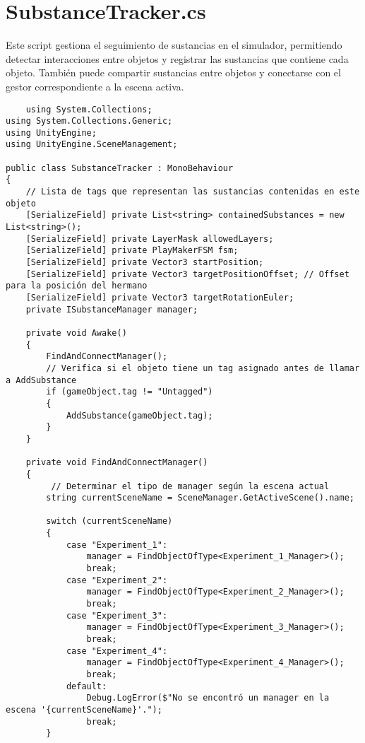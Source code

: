 \section{SubstanceTracker.cs}\label{script:SubstanceTracker}
Este script gestiona el seguimiento de sustancias en el simulador, permitiendo detectar interacciones entre objetos y registrar las sustancias que contiene cada objeto. También puede compartir sustancias entre objetos y conectarse con el gestor correspondiente a la escena activa.
\begin{verbatim}
    using System.Collections;
using System.Collections.Generic;
using UnityEngine;
using UnityEngine.SceneManagement;

public class SubstanceTracker : MonoBehaviour
{
    // Lista de tags que representan las sustancias contenidas en este objeto
    [SerializeField] private List<string> containedSubstances = new List<string>();
    [SerializeField] private LayerMask allowedLayers;
    [SerializeField] private PlayMakerFSM fsm;
    [SerializeField] private Vector3 startPosition;
    [SerializeField] private Vector3 targetPositionOffset; // Offset para la posición del hermano
    [SerializeField] private Vector3 targetRotationEuler;
    private ISubstanceManager manager;

    private void Awake()
    {
        FindAndConnectManager();
        // Verifica si el objeto tiene un tag asignado antes de llamar a AddSubstance
        if (gameObject.tag != "Untagged")
        {
            AddSubstance(gameObject.tag);
        }
    }
    
    private void FindAndConnectManager()
    {
         // Determinar el tipo de manager según la escena actual
        string currentSceneName = SceneManager.GetActiveScene().name;

        switch (currentSceneName)
        {
            case "Experiment_1":
                manager = FindObjectOfType<Experiment_1_Manager>();
                break;
            case "Experiment_2":
                manager = FindObjectOfType<Experiment_2_Manager>();
                break;
            case "Experiment_3":
                manager = FindObjectOfType<Experiment_3_Manager>();
                break;
            case "Experiment_4":
                manager = FindObjectOfType<Experiment_4_Manager>();
                break;
            default:
                Debug.LogError($"No se encontró un manager en la escena '{currentSceneName}'.");
                break;
        }


\end{verbatim}
